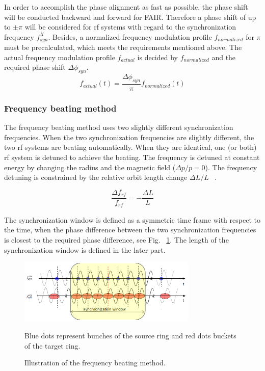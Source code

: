 In order to accomplish the phase alignment as fast as possible, the phase shift will be conducted backward and forward for FAIR. Therefore a phase shift of up to $\pm \pi$ will be considered for rf systems with regard to the synchronization frequency $f_\mathit{syn}^X$. Besides, a normalized frequency modulation profile $f_{normalized}$ for $\pi$ must be precalculated, which meets the requirements mentioned above. The actual frequency modulation profile $f_{actual}$ is decided by $f_{normalized}$ and the required phase shift $\Delta \phi_\mathit{syn}$. 
\begin{equation}
f_{\mathit{actual}}(t)=\frac{\Delta \phi_\mathit{syn}}{\pi}f_{\mathit{normalized}}(t) \label{actual_profile}
\end{equation}
 

\subsubsection{Frequency beating method}
The frequency beating method uses two slightly different synchronization frequencies. When the two synchronization frequencies are slightly different, the two rf systems are beating automatically. When they are identical, one (or both) rf system is detuned to achieve the beating. The frequency is detuned at constant energy by changing the radius and the magnetic field ($\Delta{p}/{p}=0$). The frequency detuning is constrained by the relative orbit length change $\Delta{L}/{L}$ ~\cite{bovet_selection_1970}. 

\begin{equation}
\frac{\Delta f_{\mathit{rf}}}{f_{\mathit{rf}}}= -   \frac{\Delta{L}}{L}
\label{eq:eq4}
\end{equation}

The synchronization window is defined as a symmetric time frame with respect to the time, when the phase difference between the two synchronization frequencies is closest to the required phase difference, see Fig. ~\ref{frequency_beat}. The length of the synchronization window is defined in the later part.
\begin{figure}[!htb]
   \centering   
   \includegraphics*[width=85mm]{frequency_beating.png}
   \caption{Illustration of the frequency beating method.}{\small{Blue dots represent bunches of the source ring and red dots buckets of the target ring.}}
   \label{frequency_beat}
\end{figure}

